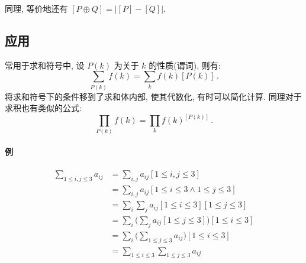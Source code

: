 \documentclass[UTF8]{ctexart}
\begin{document}
同理, 等价地还有 $ [P \oplus Q] = \big| [P] - [Q] \big| $.

\subsection*{应用}
常用于求和符号中, 设 $ P(k) $ 为关于 $ k $ 的性质(谓词), 则有:
\[ 
    \sum_{P(k)} f(k) = \sum_{k} f(k)[P(k)] \,.
\]
将求和符号下的条件移到了求和体内部, 使其代数化, 有时可以简化计算. 同理对于求积也有类似的公式:
\[ 
    \prod_{P(k)} f(k) = \prod_{k} f(k)^{[P(k)]} \,.
\]
\paragraph{例}
\begin{align*}
    \sum_{1 \leqslant i, j \leqslant 3} a_{ij} &= \sum_{i, j} a_{ij} [1 \leqslant i, j \leqslant 3] \\
    &= \sum_{i, j} a_{ij} [1 \leqslant i \leqslant 3 \land 1 \leqslant j \leqslant 3] \\
    &= \sum_i \sum_j a_{ij} [1 \leqslant i \leqslant 3] [1 \leqslant j \leqslant 3] \\
    &= \sum_i \Big( \sum_j a_{ij} [1 \leqslant j \leqslant 3] \Big) [1 \leqslant i \leqslant 3] \\
    &= \sum_i \Big( \sum_{1 \leqslant j \leqslant 3} a_{ij} \Big) [1 \leqslant i \leqslant 3] \\
    &= \sum_{1 \leqslant i \leqslant 3} \sum_{1 \leqslant j \leqslant 3} a_{ij}
\end{align*}
\end{document}
